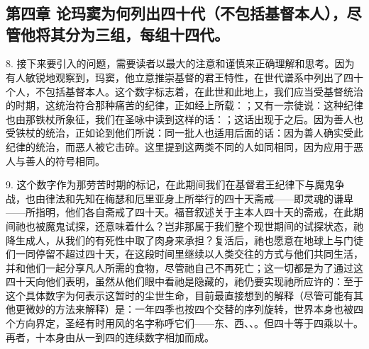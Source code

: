 

\section{}


\subsection{第四章 论玛窦为何列出四十代（不包括基督本人），尽管他将其分为三组，每组十四代。}

8. 接下来要引入的问题，需要读者以最大的注意和谨慎来正确理解和思考。因为有人敏锐地观察到，玛窦，他立意推崇基督的君王特性，在世代谱系中列出了四十个人，不包括基督本人。这个数字标志着，在此世和此地上，我们应当受基督统治的时期，这统治符合那种痛苦的纪律，正如经上所载：；又有一宗徒说：这种纪律也由那铁杖所象征，我们在圣咏中读到这样的话：；这话出现于之后。因为善人也受铁杖的统治，正如论到他们所说：同一批人也适用后面的话：因为善人确实受此纪律的统治，而恶人被它击碎。这里提到这两类不同的人如同相同，因为应用于恶人与善人的符号相同。\par

9. 这个数字作为那劳苦时期的标记，在此期间我们在基督君王纪律下与魔鬼争战，也由律法和先知在梅瑟和厄里亚身上所举行的四十天斋戒——即灵魂的谦卑——所指明，他们各自斋戒了四十天。福音叙述关于主本人四十天的斋戒，在此期间祂也被魔鬼试探，还意味着什么？岂非那属于我们整个现世期间的试探状态，祂降生成人，从我们的有死性中取了肉身来承担？复活后，祂也愿意在地球上与门徒们一同停留不超过四十天，在这段时间里继续以人类交往的方式与他们共同生活，并和他们一起分享凡人所需的食物，尽管祂自己不再死亡；这一切都是为了通过这四十天向他们表明，虽然从他们眼中看祂是隐藏的，祂仍要实现祂所应许的：至于这个具体数字为何表示这暂时的尘世生命，目前最直接想到的解释（尽管可能有其他更微妙的方法来解释）是：一年四季也按四个交替的序列旋转，世界本身也被四个方向界定，圣经有时用风的名字称呼它们——东、西、、。但四十等于四乘以十。再者，十本身由从一到四的连续数字相加而成。\par

